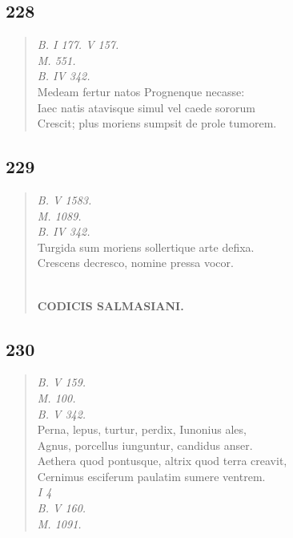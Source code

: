 \documentclass[11pt, a4paper]{report}
\begin{document}
            \subsection*{228}
      \begin{verse}
      \textit{B. I 177. V 157.} \\ \textit{M. 551.} \\ \textit{B. IV 342.} \\ Medeam fertur natos Prognenque necasse: \\ Iaec natis atavisque simul vel caede sororum \\ Crescit; plus moriens sumpsit de prole tumorem. \\ 
      \end{verse}
  
            \subsection*{229}
      \begin{verse}
      \textit{B. V 1583.} \\ \textit{M. 1089.} \\ \textit{B. IV 342.} \\ Turgida sum moriens sollertique arte defixa. \\ Crescens decresco, nomine pressa vocor. \\ 
        ﻿\pagebreak 
    \begin{center} \textbf{CODICIS SALMASIANI.} \end{center} \marginpar{[191]} 
      \end{verse}
  
            \subsection*{230}
      \begin{verse}
      \textit{B. V 159.} \\ \textit{M. 100.} \\ \textit{B. V 342.} \\ Perna, lepus, turtur, perdix, Iunonius ales, \\ Agnus, porcellus iunguntur, candidus anser. \\ Aethera quod pontusque, altrix quod terra creavit, \\ Cernimus esciferum paulatim sumere ventrem. \\ \textit{I 4} \\ \textit{B. V 160.} \\ \textit{M. 1091.} \\ 
      \end{verse}
  
\end{document}
